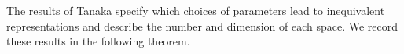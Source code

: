 \documentclass[12pt,reqno]{amsart}
\theoremstyle{remark}
\numberwithin{table}{section}
\newcommand{\Z}{\mathbb Z}
\begin{document}

The results of Tanaka \cite{Tanaka67-1} specify which choices of parameters lead to inequivalent representations and describe the number and dimension of each space. We record these results in the following theorem.
\end{document}

